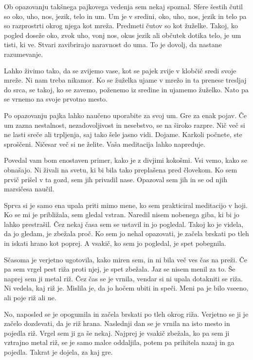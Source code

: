 Ob opazovanju takšnega pajkovega vedenja sem nekaj spoznal. Sfere šestih čutil so oko, uho, nos, jezik, telo in um. Um je v sredini, oko, uho, nos, jezik in telo pa so razprostrti okrog njega kot mreža. Predmeti čutov so kot žuželke. Takoj, ko pogled doseže oko, zvok uho, vonj nos, okus jezik ali občutek dotika telo, je um tisti, ki ve. Stvari zavibrirajo naravnost do uma. To je dovolj, da nastane razumevanje.

Lahko živimo tako, da se zvijemo vase, kot se pajek zvije v klobčič sredi svoje mreže. Ni nam treba nikamor. Ko se žuželka ujame v mrežo in ta prenese tresljaj do srca, se takoj, ko se zavemo, poženemo iz sredine in ujamemo žuželko. Nato pa se vrnemo na svoje prvotno mesto.

Po opazovanju pajka lahko naučeno uporabite za svoj um. Gre za enak pojav. Če um zazna nestalnost, nezadovoljivost in nesebstvo, se na široko razpre. Nič več si ne lasti sreče ali trpljenja, saj tako šele jasno vidi. Dojame. Karkoli počnete, ste sproščeni. Ničesar več si ne želite. Vaša meditacija lahko napreduje.


\clearpage


Povedal vam bom enostaven primer, kako je z divjimi kokošmi. Vsi vemo, kako se obnašajo. Ni živali na svetu, ki bi bila tako preplašena pred človekom. Ko sem prvič prišel v ta gozd, sem jih privadil nase. Opazoval sem jih in se od njih marsičesa naučil.

Sprva si je samo ena upala priti mimo mene, ko sem prakticiral meditacijo v hoji. Ko se mi je približala, sem gledal vstran. Naredil nisem nobenega giba, ki bi jo lahko prestrašil. Čez nekaj časa sem se ustavil in jo pogledal. Takoj ko je videla, da jo gledam, je zbežala proč. Ko sem jo nehal opazovati, je začela brskati po tleh in iskati hrano kot poprej. A vsakič, ko sem jo pogledal, je spet pobegnila.

Sčasoma je verjetno ugotovila, kako miren sem, in ni bila več ves čas na preži. Če pa sem vrgel pest riža proti njej, je spet zbežala. Jaz se nisem menil za to. Še naprej sem ji metal riž. Čez čas se je vrnila, vendar si ni upala dotakniti se riža. Ni vedela, kaj riž je. Mislila je, da jo hočem ubiti in speči. Meni pa je bilo vseeno, ali poje riž ali ne.

No, naposled se je opogumila in začela brskati po tleh okrog riža. Verjetno se ji je začelo dozdevati, da je riž hrana. Naslednji dan se je vrnila na isto mesto in pojedla riž. Vrgel sem ji ga še nekaj. Najprej je vsakič zbežala, ko pa sem ji vztrajno metal riž, se je samo malce oddaljila, potem pa prihitela nazaj in ga pojedla. Takrat je dojela, za kaj gre.

